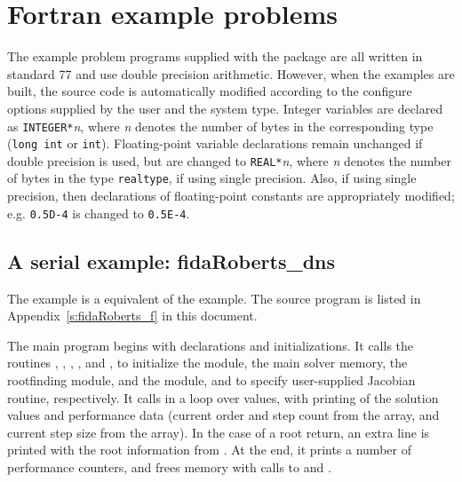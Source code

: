 \section{Fortran example problems}\label{s:ex_fortran}

The {\F} example problem programs supplied with the {\ida}
package are all written in standard {\F}77 and use double precision
arithmetic. However, when the {\F} examples are built, the source code is
automatically modified according to the configure options supplied by the
user and the system type. Integer variables are declared as {\tt INTEGER*}{\em n},
where {\em n} denotes the number of bytes in the corresponding {\C} type
({\tt long int} or {\tt int}). Floating-point variable declarations remain
unchanged if double precision is used, but are changed to {\tt REAL*}{\em n},
where {\em n} denotes the number of bytes in the {\sundials} type {\tt realtype},
if using single precision. Also, if using single precision, then declarations of
floating-point constants are appropriately modified; e.g. {\tt 0.5D-4} is
changed to {\tt 0.5E-4}.


\subsection{A serial example: fidaRoberts\_dns}\label{ss:fidaRoberts}

The  example is a {\F} equivalent of the
 example.  The source program 
is listed in Appendix~\ref{s:fidaRoberts_f} in this document.

The main program begins with declarations and initializations.  
It calls the routines , , , 
, and , to initialize the {\nvecs} module, 
the main solver memory, the rootfinding module, and the {\idadense} module, 
and to specify user-supplied Jacobian routine, respectively.
It calls  in a loop over  values, with printing of
the solution values and performance data (current order and step count
from the  array, and current step size from the  array).
In the case of a root return, an extra line is printed with the root
information from .  At the end, it prints a number of
performance counters, and frees memory with calls to 
and .

